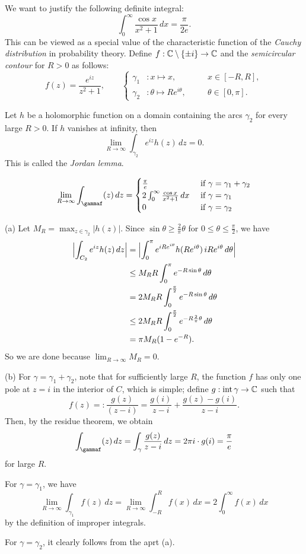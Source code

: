 \documentclass{../../large}
\begin{document}
\begin{prb}
We want to justify the following definite integral:
\[\int_0^\infty\frac{\cos x}{x^2+1}\,dx=\frac\pi{2e}.\]
This can be viewed as a special value of the characteristic function of the \emph{Cauchy distribution} in probability theory.
Define $f:\mathbb{C}\setminus\{\pm i\}\to\mathbb{C}$ and the \emph{semicircular contour} for $R>0$ as follows:
\[f(z)=\frac{e^{iz}}{z^2+1},\qquad
\left\{
\begin{alignedat}{2}
\gamma_1&:x\mapsto x,&\quad&x\in[-R,R],\\
\gamma_2&:\theta\mapsto Re^{i\theta},&&\theta\in[0,\pi].
\end{alignedat}
\right.\]
\begin{parts}
\item Let $h$ be a holomorphic function on a domain containing the arcs $\gamma_2$ for every large $R>0$.
If $h$ vanishes at infinity, then
\[\lim_{R\to\infty}\int_{\gamma_2}e^{iz}h(z)\,dz=0.\]
This is called the \emph{Jordan lemma}.
\item
\[\lim_{R\to\infty}\int_\gammaf(z)\,dz=\begin{cases}
\frac\pi e&\text{ if }\gamma=\gamma_1+\gamma_2\\
2\int_0^\infty\frac{\cos x}{x^2+1}\,dx&\text{ if }\gamma=\gamma_1\\
0&\text{ if }\gamma=\gamma_2
\end{cases}\]
\end{parts}
\end{prb}
\begin{pf}
(a)
Let $M_R=\max_{z\in \gamma_2}|h(z)|$.
Since $\sin\theta\ge\frac2\pi\theta$ for $0\le\theta\le\frac\pi2$, we have
\begin{align*}
\Bigl|\int_{C_2}e^{iz}h(z)\,dz\Bigr|
&=\Bigl|\int_0^\pi e^{iRe^{i\theta}}h(Re^{i\theta})\,iRe^{i\theta}\,d\theta\Bigr|\\
&\le M_RR\int_0^\pi e^{-R\sin\theta}\,d\theta\\
&=2M_RR\int_0^{\frac\pi2}e^{-R\sin\theta}\,d\theta\\
&\le2M_RR\int_0^{\frac\pi2}e^{-R\frac2\pi\theta}\,d\theta\\\
&=\pi M_R(1-e^{-R}).
\end{align*}
So we are done because $\lim_{R\to\infty}M_R=0$.

(b)
For $\gamma=\gamma_1+\gamma_2$, note that for sufficiently large $R$, the function $f$ has only one pole at $z=i$ in the interior of $C$, which is simple; define $g:\operatorname{int}\gamma\to\mathbb{C}$ such that
\[f(z)=:\frac{g(z)}{(z-i)}=\frac{g(i)}{z-i}+\frac{g(z)-g(i)}{z-i}.\]
Then, by the residue theorem, we obtain
\[\int_\gammaf(z)\,dz=\int_\gamma\frac{g(z)}{z-i}\,dz=2\pi i\cdot g(i)=\frac\pi e\]
for large $R$.

For $\gamma=\gamma_1$, we have
\[\lim_{R\to\infty}\int_{\gamma_1}f(z)\,dz=\lim_{R\to\infty}\int_{-R}^Rf(x)\,dx=2\int_0^\infty f(x)\,dx\]
by the definition of improper integrals.

For $\gamma=\gamma_2$, it clearly follows from the aprt (a).
\end{pf}
\end{document}
